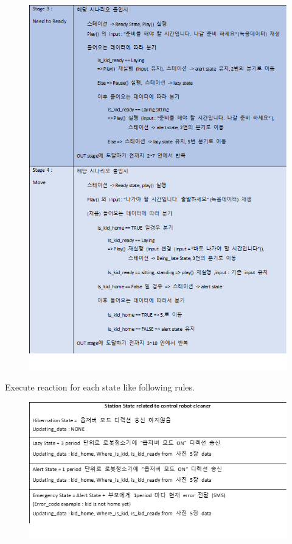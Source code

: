 \documentclass[conference]{IEEEtran}
\begin{document}
\begin{enumerate}[label=\arabic*.]
\begin{enumerate}[label=\arabic*.]
\begin{enumerate}[label=\alph*.]
        \begin{figure}[H]\centering\includegraphics[scale=0.335]{images/rule2.png}\end{figure}
        Execute reaction for each state like following rules.
        \begin{figure}[H]\centering\includegraphics[scale=0.35]{images/rule3.png}\end{figure}

\end{enumerate}
\end{enumerate}
\end{enumerate}
\end{document}
